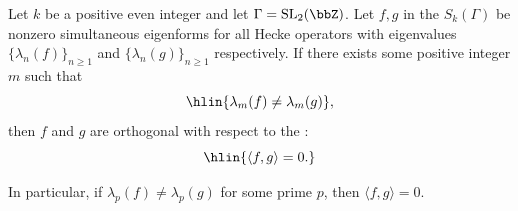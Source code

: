 \begin{proposition} \label{proposition:eigenforms_with_distinct_hecke_eigenvalues_are_orthogonal}
Let $k$ be a positive even integer and let $\Gamma = \mathrm{SL}_2(\bbZ)$. Let $f, g$ in the  $S_k(\Gamma)$ be nonzero simultaneous eigenforms for all Hecke operators with eigenvalues $\{\lambda_n(f)\}_{n\geq 1}$ and $\{\lambda_n(g)\}_{n\geq 1}$ respectively. If there exists some positive integer $m$ such that
$$\hlin{\lambda_m(f) \neq \lambda_m(g)},$$
then $f$ and $g$ are orthogonal with respect to the :
$$\hlin{\langle f, g \rangle = 0.}$$

In particular, if $\lambda_p(f) \neq \lambda_p(g)$ for some prime $p$, then $\langle f, g \rangle = 0$.
\end{proposition}

%
